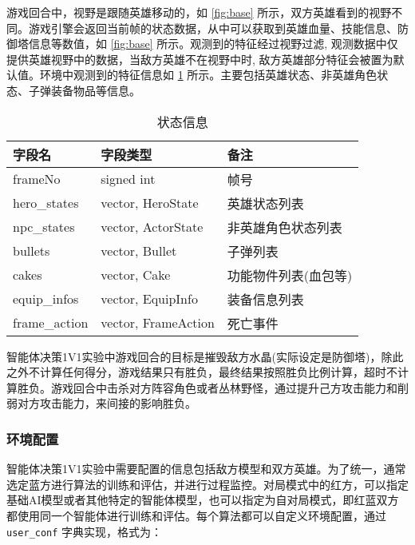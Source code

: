 
游戏回合中，视野是跟随英雄移动的，如 \cref{fig:base} 所示，双方英雄看到的视野不同。游戏引擎会返回当前帧的状态数据，从中可以获取到英雄血量、技能信息、防御塔信息等数值，如 \cref{fig:base} 所示。观测到的特征经过视野过滤, 观测数据中仅提供英雄视野中的数据，当敌方英雄不在视野中时, 敌方英雄部分特征会被置为默认值。环境中观测到的特征信息如 \cref{tab:frame_state} 所示。主要包括英雄状态、非英雄角色状态、子弹装备物品等信息。

\begin{table}[ht]
    \centering
    \begin{tabular}{|l|l|l|} \hline
        字段名        & 字段类型            & 备注                 \\ \hline
        frameNo       & signed int          & 帧号                 \\ \hline
        hero\_states  & vector, HeroState   & 英雄状态列表         \\ \hline
        npc\_states   & vector, ActorState  & 非英雄角色状态列表   \\ \hline
        bullets       & vector, Bullet      & 子弹列表             \\ \hline
        cakes         & vector, Cake        & 功能物件列表(血包等) \\ \hline
        equip\_infos  & vector, EquipInfo   & 装备信息列表         \\ \hline
        frame\_action & vector, FrameAction & 死亡事件             \\ \hline
    \end{tabular}
    \caption{状态信息} \label{tab:frame_state}
\end{table}


智能体决策1V1实验中游戏回合的目标是摧毁敌方水晶(实际设定是防御塔)，除此之外不计算任何得分，游戏结果只有胜负，最终结果按照胜负比例计算，超时不计算胜负。游戏回合中击杀对方阵容角色或者丛林野怪，通过提升己方攻击能力和削弱对方攻击能力，来间接的影响胜负。

\subsubsection{环境配置}

智能体决策1V1实验中需要配置的信息包括敌方模型和双方英雄。为了统一，通常选定蓝方进行算法的训练和评估，并进行过程监控。对局模式中的红方，可以指定基础AI模型或者其他特定的智能体模型，也可以指定为自对局模式，即红蓝双方都使用同一个智能体进行训练和评估。每个算法都可以自定义环境配置，通过 \verb|user_conf| 字典实现，格式为：

